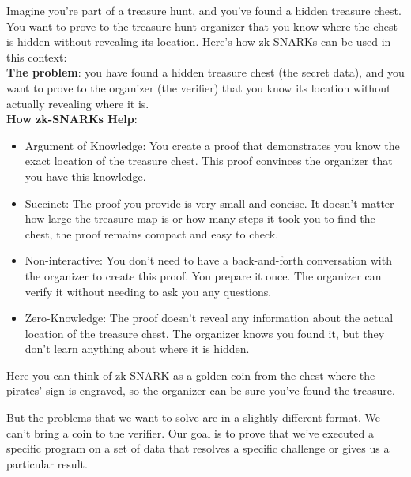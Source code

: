 \documentclass[../lecture-notes.tex]{subfiles}
\begin{document}
\begin{example}
    Imagine you're part of a treasure hunt, and you've found a hidden treasure chest. You want to 
    prove to the treasure hunt organizer that you know where the chest is hidden without revealing
    its location. Here's how zk-SNARKs can be used in this context: \\

    \textbf{The problem}: you have found a hidden treasure chest (the secret data), and you want to
    prove to the organizer (the verifier) that you know its location without actually revealing 
    where it is. \\

    \textbf{How zk-SNARKs Help}:

    \begin{itemize}
        \item Argument of Knowledge: You create a proof that demonstrates you know the exact
        location of the treasure chest. This proof convinces the organizer that you have this 
        knowledge.
        \item Succinct: The proof you provide is very small and concise. It doesn't matter how
        large the treasure map is or how many steps it took you to find the chest, the proof remains
        compact and easy to check.
        \item Non-interactive: You don't need to have a back-and-forth conversation with the 
        organizer to create this proof. You prepare it once. The organizer can verify it without 
        needing to ask you any questions.
        \item Zero-Knowledge: The proof doesn't reveal any information about the actual location of
        the treasure chest. The organizer knows you found it, but they don't learn anything about 
        where it is hidden. \\
    \end{itemize}

    Here you can think of zk-SNARK as a golden coin from the chest where the pirates' sign is 
    engraved, so the organizer can be sure you've found the treasure.
\end{example}

But the problems that we want to solve are in a slightly different format. We can't bring a coin to
the verifier. Our goal is to prove that we've executed a specific program on a set of data that 
resolves a specific challenge or gives us a particular result.
\end{document}
